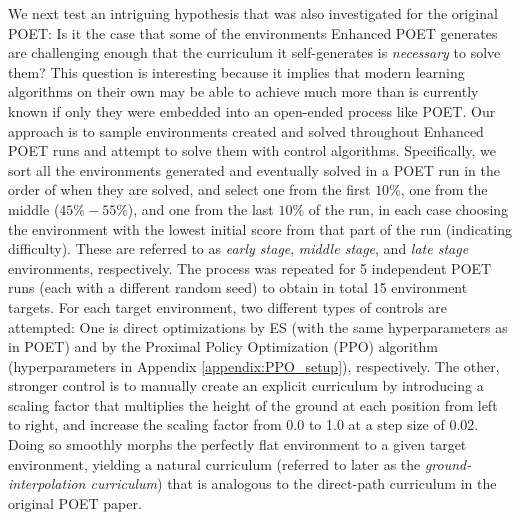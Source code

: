 \documentclass{article}
\newcommand{\todo}[1]{\comments{\textcolor{red}{[TODO: #1]}}}
\newcommand{\comments}[1]{#1} %
\begin{document}

We next test an intriguing hypothesis that was also investigated for the original POET: Is it the case that some of the environments Enhanced POET generates are challenging enough that the curriculum it self-generates is \emph{necessary} to solve them? This question is interesting because it implies that modern learning algorithms on their own may be able to achieve much more than is currently known if only they were embedded into an open-ended process like POET. Our approach is to sample environments created and solved throughout Enhanced POET runs and attempt to solve them with control algorithms. Specifically, we sort all the environments generated and eventually solved in a POET run in the order of when they are solved, and select one from the first $10\%$, one from the middle ($45\%-55\%$), and one from the last $10\%$ of the run, in each case choosing the environment with the lowest initial score from that part of the run (indicating difficulty). These are referred to as \emph{early stage}, \emph{middle stage}, and \emph{late stage} environments, respectively. The process was repeated for 5 independent POET runs (each with a different random seed) to obtain in total 15 environment targets. For each target environment, two different types of controls are attempted: One is direct optimizations by ES (with the same hyperparameters as in POET) and by the Proximal Policy Optimization (PPO) algorithm \cite{schulman2017proximal} (hyperparameters in Appendix \ref{appendix:PPO_setup}), respectively. The other, stronger control is to manually create an explicit curriculum by introducing a scaling factor that multiplies the height of the ground at each position from left to right, and increase the scaling factor from 0.0 to 1.0 at a step size of 0.02. Doing so smoothly morphs the perfectly flat environment to a given target environment, yielding a natural curriculum (referred to later as the \emph{ground-interpolation curriculum}) that is analogous to the direct-path curriculum in the original POET paper.
\end{document}
